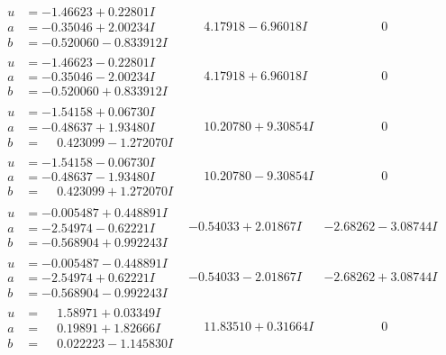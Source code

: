 \documentclass[1p]{elsarticle_modified}
\theoremstyle{definition}
\begin{document}
$$\begin{array}{c|c|c}
\begin{aligned}
u &= -1.46623 + 0.22801 I \\
a &= -0.35046 + 2.00234 I \\
b &= -0.520060 - 0.833912 I\end{aligned}
 & \phantom{-}4.17918 - 6.96018 I & \phantom{-0.000000 } 0 \\ \hline\begin{aligned}
u &= -1.46623 - 0.22801 I \\
a &= -0.35046 - 2.00234 I \\
b &= -0.520060 + 0.833912 I\end{aligned}
 & \phantom{-}4.17918 + 6.96018 I & \phantom{-0.000000 } 0 \\ \hline\begin{aligned}
u &= -1.54158 + 0.06730 I \\
a &= -0.48637 + 1.93480 I \\
b &= \phantom{-}0.423099 - 1.272070 I\end{aligned}
 & \phantom{-}10.20780 + 9.30854 I & \phantom{-0.000000 } 0 \\ \hline\begin{aligned}
u &= -1.54158 - 0.06730 I \\
a &= -0.48637 - 1.93480 I \\
b &= \phantom{-}0.423099 + 1.272070 I\end{aligned}
 & \phantom{-}10.20780 - 9.30854 I & \phantom{-0.000000 } 0 \\ \hline\begin{aligned}
u &= -0.005487 + 0.448891 I \\
a &= -2.54974 - 0.62221 I \\
b &= -0.568904 + 0.992243 I\end{aligned}
 & -0.54033 + 2.01867 I & -2.68262 - 3.08744 I \\ \hline\begin{aligned}
u &= -0.005487 - 0.448891 I \\
a &= -2.54974 + 0.62221 I \\
b &= -0.568904 - 0.992243 I\end{aligned}
 & -0.54033 - 2.01867 I & -2.68262 + 3.08744 I \\ \hline\begin{aligned}
u &= \phantom{-}1.58971 + 0.03349 I \\
a &= \phantom{-}0.19891 + 1.82666 I \\
b &= \phantom{-}0.022223 - 1.145830 I\end{aligned}
 & \phantom{-}11.83510 + 0.31664 I & \phantom{-0.000000 } 0\\

\end{array}$$
\end{document}
